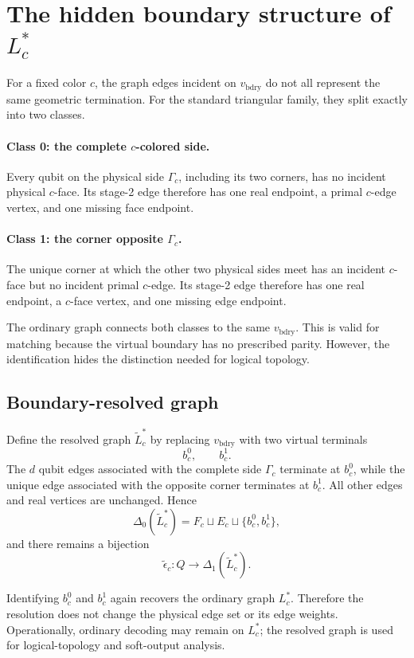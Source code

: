 \documentclass[11pt]{article}
\begin{document}
\section{The hidden boundary structure of $L_c^*$}

For a fixed color $c$, the graph edges incident on $v_{\mathrm{bdry}}$ do not
all represent the same geometric termination. For the standard triangular
family, they split exactly into two classes.

\paragraph{Class 0: the complete $c$-colored side.}
Every qubit on the physical side $\Gamma_c$, including its two corners, has
no incident physical $c$-face. Its stage-2 edge therefore has one real
endpoint, a primal $c$-edge vertex, and one missing face endpoint.

\paragraph{Class 1: the corner opposite $\Gamma_c$.}
The unique corner at which the other two physical sides meet has an incident
$c$-face but no incident primal $c$-edge. Its stage-2 edge therefore has one
real endpoint, a $c$-face vertex, and one missing edge endpoint.

The ordinary graph connects both classes to the same $v_{\mathrm{bdry}}$.
This is valid for matching because the virtual boundary has no prescribed
parity. However, the identification hides the distinction needed for logical
topology.

\subsection{Boundary-resolved graph}

Define the resolved graph $\widetilde L_c^*$ by replacing
$v_{\mathrm{bdry}}$ with two virtual terminals
\[
  b_c^0,\qquad b_c^1.
\]
The $d$ qubit edges associated with the complete side $\Gamma_c$ terminate at
$b_c^0$, while the unique edge associated with the opposite corner terminates
at $b_c^1$. All other edges and real vertices are unchanged. Hence
\[
  \Delta_0(\widetilde L_c^*)
   =F_c\sqcup E_c\sqcup\{b_c^0,b_c^1\},
\]
and there remains a bijection
\[
  \widetilde\epsilon_c:
  Q\longrightarrow\Delta_1(\widetilde L_c^*).
\]

Identifying $b_c^0$ and $b_c^1$ again recovers the ordinary graph $L_c^*$.
Therefore the resolution does not change the physical edge set or its edge
weights. Operationally, ordinary decoding may remain on $L_c^*$; the resolved
graph is used for logical-topology and soft-output analysis.
\end{document}

